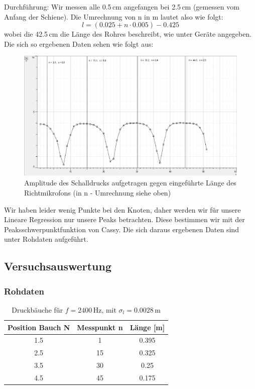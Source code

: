\documentclass[12pt,a4paper]{article}
\begin{document}
Durchführung:\newline
Wir messen alle 0.5$\,$cm angefangen bei 2.5$\,$cm (gemessen vom Anfang der Schiene). Die Umrechnung von n in m lautet also wie folgt:
\begin{equation}
l = (0.025 + n\cdot 0.005) - 0.425
\end{equation}
wobei die 42.5$\,$cm die Länge des Rohres beschreibt, wie unter Geräte angegeben.
Die sich so ergebenen Daten sehen wie folgt aus:
\begin{figure}[H]
\centering
\includegraphics[scale=0.3]{Bilder/baeuche.png}
\caption{Amplitude des Schalldrucks aufgetragen gegen eingeführte Länge des Richtmikrofons (in n - Umrechnung siehe oben)}
\end{figure}
Wir haben leider wenig Punkte bei den Knoten, daher werden wir für unsere Lineare Regression nur unsere Peaks betrachten. Diese bestimmen wir mit der Peaksschwerpunktfunktion von Cassy.
Die sich daraus ergebenen Daten sind unter Rohdaten aufgeführt.

\subsection{Versuchsauswertung}

\subsubsection{Rohdaten}
\begin{table}[H]
\begin{tabular}{c|c|c}
Position Bauch N & Messpunkt n & Länge [m] \\ 
\hline 
1.5 & 1 & 0.395 \\ 
2.5 & 15 & 0.325 \\ 
3.5 & 30 & 0.25 \\ 
4.5 & 45 & 0.175 \\ 
\end{tabular}
\caption{Druckbäuche für $f = 2400\,$Hz, mit $\sigma_l = 0.0028\,$m}
\end{table}
\end{document}
